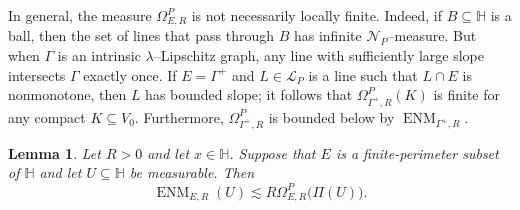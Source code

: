 \documentclass[11pt,reqno]{amsart}
\renewcommand{\H}{\mathbb{H}}
\newcommand{\cL}{\mathcal{L}}
\newcommand{\cN}{\mathcal{N}}
\newcommand{\0}{\mathbf{0}}
\renewcommand{\1}{\mathbf 1}
\renewcommand{\subset}{\subseteq}
\newtheorem{lemma}[thm]{Lemma}
\theoremstyle{remark}
\DeclareMathOperator{\ENM}{ENM}
\begin{document}
In general, the measure $\Omega^P_{E, R}$ is not necessarily locally finite. Indeed, if $B\subset \H$ is a ball, then the set of lines that pass through $B$ has infinite $\cN_P$--measure.  But when $\Gamma$ is an intrinsic $\lambda$--Lipschitz graph, any line with sufficiently large slope intersects $\Gamma$ exactly once.  If $E=\Gamma^+$ and $L\in \cL_P$ is a line such that $L\cap E$ is nonmonotone, then $L$ has bounded slope; it follows that $\Omega^P_{\Gamma^+,R}(K)$ is finite for any compact $K\subset V_0$. Furthermore, $\Omega^P_{\Gamma^+,R}$ is bounded below by $\ENM_{\Gamma^+,R}$.

\begin{lemma}\label{lem:measure comparison}
  Let $R>0$ and let $x\in \H$.  Suppose that $E$ is a finite-perimeter subset of $\H$ and let $U\subset \H$ be measurable.  Then
  $$\ENM_{E,R}(U) \lesssim R \Omega^P_{E,R}\big(\Pi(U)\big).$$
\end{lemma}
\end{document}
